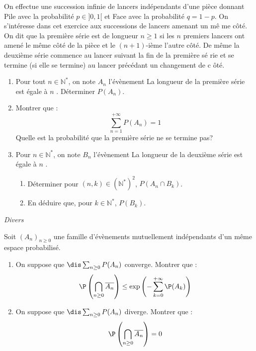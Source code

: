 \documentclass[a4paper,10pt]{report}
\begin{document}
\begin{Exa} On effectue une succession infinie de lancers indépendants d'une pièce
donnant Pile avec la probabilité $p\in ]0,1[$ et Face avec la probabilité $%
q=1-p$.\newline
On s'intéresse dans cet exercice aux successions de lancers amenant un mê%
me côté.\newline
On dit que la première série est de longueur $n\geq 1$ si les $n$
premiers lancers ont amené le même côté de la pièce et le $(n+1)$-ième
l'autre côté.\newline
De même la deuxième série commence au lancer suivant la fin de la première sé%
rie et se termine (si elle se termine) au lancer précédant un changement de c%
ôté.\newline


\begin{enumerate}
\item Pour tout $n \in \mathbb{N}^*$, on note $A_n$ l'évènement \og La longueur de la première série est égale à $n$ \fg. Déterminer $P(A_n)$.
\item Montrer que :
\[\sum\limits_{n=1}^{+\infty }P(A_n)=1\]
Quelle est la probabilité que la première série ne se termine pas?

\item Pour $n \in \mathbb{N}^*$, on note $B_n$ l'évènement \og La longueur de la deuxième série est égale à $n$ \fg .

\begin{enumerate}
\item Déterminer pour $(n,k) \in (\mathbb{N}^*)^2$, $P(A_n \cap B_k)$.

\item En déduire que, pour $k\in \mathbb{N}^{* }$, $P(B_k)$.
\end{enumerate}
\end{enumerate}
\end{Exa}


\medskip

\begin{center}
\textit{{ {\large Divers}}}
\end{center}

\medskip


\begin{Exa}[\ding{80}]  Soit $(A_n)_{n \geq 0}$ une famille d'évènements mutuellement indépendants d'un même espace probabilisé.
\begin{enumerate}
\item On suppose que $\dis \sum_{n \geq 0} P(A_n)$ converge. Montrer que :
$$ \P \left( \bigcap_{n \geq 0} \overline{A_n} \right) \leq \exp \left(- \sum_{k=0}^{+ \infty} \P(A_k) \right)$$
\item On suppose que $\dis \sum_{n \geq 0} P(A_n)$ diverge. Montrer que :
$$ \P \left( \bigcap_{n \geq 0} \overline{A_n} \right) = 0$$
\end{enumerate}
\end{Exa}
\end{document}
